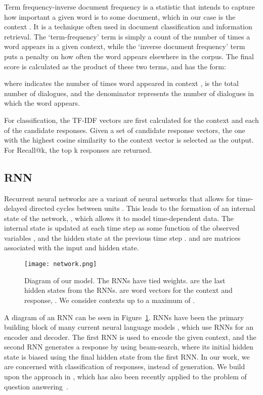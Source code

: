 \documentclass[11pt,a4paper]{article}
\begin{document}
Term frequency-inverse document frequency is a statistic that intends to capture how important a given word is to some document, which in our case is the context \cite{ramos2003using}. It is a technique often used in document classification and information retrieval. The `term-frequency' term is simply a count of the number of times a word appears in a given  context, while the `inverse document frequency' term puts a penalty on how often the word appears elsewhere in the corpus. The final score is calculated as the product of these two terms, and has the form:

where  indicates the number of times word  appeared in context ,  is the total number of dialogues, and the denominator represents the number of dialogues in which the word   appears. 

For classification, the TF-IDF vectors are first calculated for the context and each of the candidate responses. Given a set of candidate response vectors, the one with the highest cosine similarity to the context vector is selected as the output. For Recall@k, the top k responses are returned.

\subsection{RNN}


Recurrent neural networks are a variant of neural networks that allows for time-delayed directed cycles between units \cite{medsker2001recurrent}. This leads to the formation of an internal state of the network, ,  which allows it to model time-dependent data. The internal state is updated at each time step as some function of the observed variables , and the hidden state at the previous time step .  and  are matrices associated with the input and hidden state.



\begin{figure}
\centering
\texttt{[image: network.png]}
\caption{\label{rnn1}Diagram of our model. The RNNs have tied weights.  are the last hidden states from the RNNs.  are word vectors for the context and response, . We consider contexts up to a maximum of . }
\end{figure}

A diagram of an RNN can be seen in Figure~\ref{rnn1}. RNNs have been the primary building block of many current neural language models \cite{ritter2011data, sordoni2015}, which use RNNs for an encoder and decoder. The first RNN is used to encode the given context, and the second RNN generates a response by using beam-search, where its initial hidden state is biased using the final hidden state from the first RNN.  In our work, we are concerned with classification of responses, instead of generation. We build upon the approach in \cite{bordes2014open}, which has also been recently applied to the problem of question answering~\cite{yu2014deep}.
\end{document}
